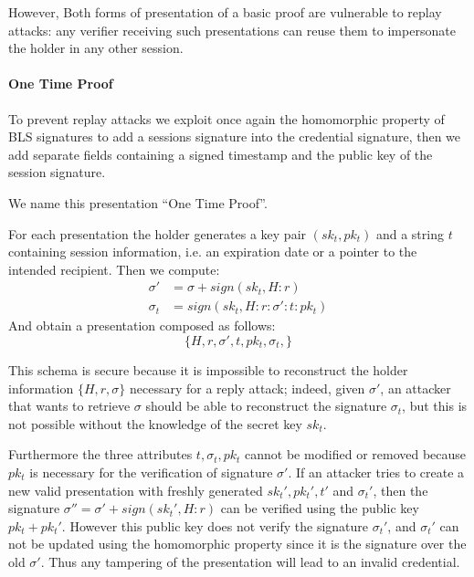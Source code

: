 However, Both forms of presentation of a basic proof are vulnerable to
replay attacks: any verifier receiving such presentations can reuse
them to impersonate the holder in any other session.

\paragraph{One Time Proof}

To prevent replay attacks we exploit once again the homomorphic
property of BLS signatures to add a sessions signature into the
credential signature, then we add separate fields containing a signed
timestamp and the public key of the session signature.

We name this presentation ``One Time Proof''.

For each presentation the holder generates a key pair $(sk_t, pk_t)$
and a string $t$ containing session information, i.e. an expiration
date or a pointer to the intended recipient. Then we compute:
\begin{equation*}
    \begin{split}
        \sigma' &= \sigma + sign(sk_t, H : r) \\
        \sigma_{t} &= sign(sk_t, H : r : \sigma' : t : pk_t)
    \end{split}
\end{equation*}
And obtain a presentation composed as follows:
\begin{equation*}
    \{H, r, \sigma', t, pk_t,  \sigma_t,\}
\end{equation*}

This schema is secure because it is impossible to reconstruct the
holder information $\{H,r,\sigma\}$ necessary for a reply attack;
indeed, given $\sigma'$, an attacker that wants to retrieve $\sigma$
should be able to reconstruct the signature $\sigma_t$,
but this is not possible without the knowledge of the secret key $sk_t$.

Furthermore the three attributes $t,\sigma_t, pk_t$ cannot be modified
or removed because $pk_t$ is necessary for the verification of
signature $\sigma'$.
If an attacker tries to create a new valid presentation with freshly generated $sk_t', pk_t', t'$
and $\sigma_t'$, then the signature $\sigma'' = \sigma' + sign(sk_t', H:r)$
can be verified using the public key $pk_t + pk_t'$.
However this public key does not verify the signature $\sigma_t'$, and $\sigma_t'$
can not be updated using the homomorphic property since it is the signature over the old $\sigma'$.
Thus any tampering of the presentation will lead to an invalid credential.

